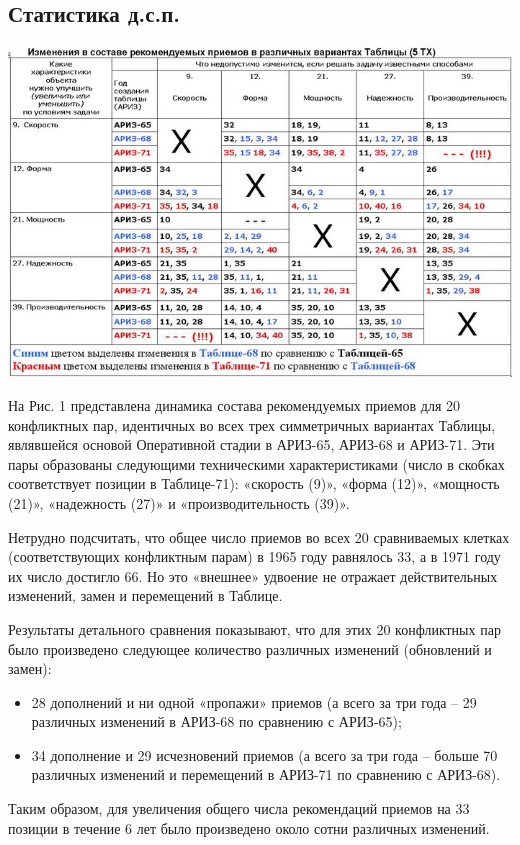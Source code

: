 \documentclass[11pt,a4paper]{article}
\begin{document}
\subsection*{Статистика д.с.п.}

\begin{center}
  \includegraphics[width=.8\textwidth]{./20.jpg} 
\end{center}

На Рис. 1 представлена динамика состава рекомендуемых приемов для 20
конфликтных пар, идентичных во всех трех симметричных вариантах Таблицы,
являвшейся основой Оперативной стадии в АРИЗ-65, АРИЗ-68 и АРИЗ-71. Эти пары
образованы следующими техническими характеристиками (число в скобках
соответствует позиции в Таблице-71): «скорость (9)», «форма (12)», «мощность
(21)», «надежность (27)» и «производительность (39)».

Нетрудно подсчитать, что общее число приемов во всех 20 сравниваемых клетках
(соответствующих конфликтным парам) в 1965 году равнялось 33, а в 1971 году их
число достигло 66. Но это «внешнее» удвоение не отражает действительных
изменений, замен и перемещений в Таблице.

Результаты детального сравнения показывают, что для этих 20 конфликтных пар
было произведено следующее количество различных изменений (обновлений и
замен):
\begin{itemize}
\item 28 дополнений и ни одной «пропажи» приемов (а всего за три года -- 29
  различных изменений в АРИЗ-68 по сравнению с АРИЗ-65);
\item 34 дополнение и 29 исчезновений приемов (а всего за три года -- больше
  70 различных изменений и перемещений в АРИЗ-71 по сравнению с АРИЗ-68).
\end{itemize}
Таким образом, для увеличения общего числа рекомендаций приемов на 33 позиции
в течение 6 лет было произведено около сотни различных изменений.
\end{document}
